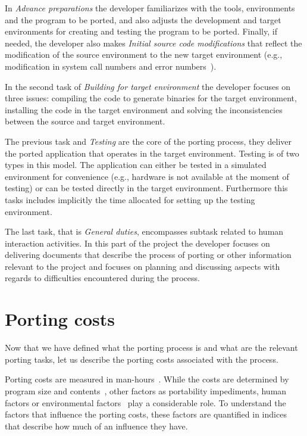 In \textit{Advance preparations} the developer familiarizes with the tools,
environments and the program to be ported, and also adjusts the development and
target environments for creating and testing the program to be ported. Finally,
if needed, the developer also makes \textit{Initial source code modifications}
that reflect the modification of the source environment to the new target
environment (e.g., modification in system call numbers and error
numbers~\cite{callahanopenbsd}).

In the second task of \textit{Building for target environment} the developer
focuses on three issues: compiling the code to generate binaries for the
target environment, installing the code in the target environment and solving
the inconsistencies between the source and target environment.

The previous task and \textit{Testing} are the core of the porting process, they
deliver the ported application that operates in the target environment.
Testing is of two types in this model. The application can either be tested in a
simulated environment for convenience (e.g., hardware is not available at the
moment of testing) or can be tested directly in the target environment.
Furthermore this tasks includes implicitly the time allocated for setting up the
testing environment.

The last task, that is \textit{General duties}, encompasses subtask related to
human interaction activities. In this part of the project the developer focuses
on delivering documents that describe the process of porting or other
information relevant to the project and focuses on planning and discussing
aspects with regards to difficulties encountered during the process.

\section{Porting costs}

Now that we have defined what the porting process is and what are the relevant
porting tasks, let us describe the porting costs associated with the process.

Porting costs are measured in man-hours~\cite{tanaka, hakuta}. While the costs are
determined by program size and contents~\cite{hakuta}, other factors as portability
impediments, human factors or environmental factors~\cite{hakuta} play a
considerable role. To understand the factors that influence the porting costs,
these factors are quantified in indices that describe how much of an influence
they have.

